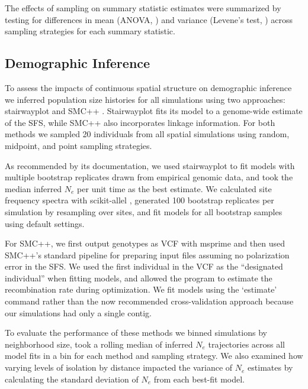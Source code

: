 \documentclass[10pt,twoside,lineno,hidelinks]{preprint}
\begin{document}
The effects of sampling on summary statistic estimates were summarized by testing for differences in mean (ANOVA, \citep{Rcore2018}) and variance (Levene's test, \citep{Fox2011}) across sampling strategies for each summary statistic. 


\subsection{Demographic Inference}

To assess the impacts of continuous spatial structure on demographic inference we inferred population size histories for all simulations using two approaches: stairwayplot \citep{Liu2015} and SMC++ \citep{Terhorst2016}. Stairwayplot fits its model to a genome-wide estimate of the SFS, while SMC++ also incorporates linkage information. %
For both methods we sampled 20 individuals from all spatial simulations using random, midpoint, and point sampling strategies. 

As recommended by its documentation, we used stairwayplot to fit models with multiple bootstrap replicates drawn from empirical genomic data, and took the median inferred $N_{e}$ per unit time as the best estimate. We calculated site frequency spectra with scikit-allel \citep{Miles2017}, generated 100 bootstrap replicates per simulation by resampling over sites, and fit models for all bootstrap samples using default settings.

For SMC++, we first output genotypes as VCF with msprime and then used SMC++'s standard pipeline for preparing input files assuming no polarization error in the SFS. We used the first individual in the VCF as the ``designated individual'' when fitting models, and allowed the program to estimate the recombination rate during optimization. We fit models using the `estimate' command rather than the now recommended cross-validation approach because our simulations had only a single contig. 

To evaluate the performance of these methods we binned simulations by neighborhood size, took a rolling median of inferred $N_{e}$ trajectories across all model fits in a bin for each method and sampling strategy.  We also examined how varying levels of isolation by distance impacted the variance of $N_{e}$ estimates by calculating the standard deviation of $N_{e}$ from each best-fit model. %
\end{document}
